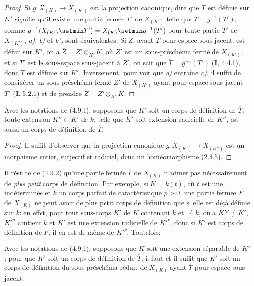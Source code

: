 \begin{proof}
Si $g:X_{(K)}\to X_{(K')}$ est la projection canonique, dire que
$\overline T$ est définie sur $K'$ signifie qu'il existe une partie fermée
$T'$ de $X_{(K')}$ telle que $\overline T=g^{-1}(T')$; comme
$g^{-1}(X_{(K')}\setmin T')=X_{(K)}\setmin g^{-1}(T')$ pour toute partie $T'$ de
$X_{(K')}$, \emph{a)}, \emph{b)} et \emph{b')} sont équivalentes. Si $\overline Z$, ayant
$\overline T$ pour espace sous-jacent, est défini sur $K'$, on a
$\overline Z=Z'\otimes_{K'}K$, où $Z'$ est un sous-préschéma fermé de
$X_{(K')}$, et si $T'$ est le sous-espace sous-jacent à $Z'$, on sait que
$\overline T=g^{-1}(T')$ (\textbf{I}, 4.4.1), donc $\overline T$ est définie sur
$K'$. Inversement, pour voir que \emph{a)} entraîne \emph{c)}, il suffit de considérer un
sous-préschéma fermé $Z'$ de $X_{(K')}$ ayant pour espace sous-jacent $T'$
(\textbf{I}, 5.2.1) et de prendre $\overline Z=Z'\otimes_{K'}K$.
\end{proof}

\begin{corollary}[4.9.2]
\label{IV.2.4.9.2-fr}
Avec les notations de \textup{(4.9.1)}, supposons que $K'$ soit un corps de définition
de $\overline T$; toute extension $K''\subset K'$ de $k$, telle que $K'$ soit
extension radicielle de $K''$, est aussi un corps de définition de
$\overline T$.
\end{corollary}

\begin{proof}
Il suffit d'observer que la projection canonique
$g:X_{(K')}\to X_{(K'')}$ est un morphisme entier, surjectif et radiciel,
donc un homéomorphisme (2.4.5).
\end{proof}

\begin{remark}[4.9.3]
\label{IV.2.4.9.3-fr}
Il résulte de (4.9.2) qu'une partie fermée $\overline T$ de $X_{(K)}$ n'admet
pas nécessairement de \emph{plus petit} corps de définition. Par exemple, si
$K=k(t)$, où $t$ est une indéterminée et $k$ un corps parfait de
caractéristique $p>0$, une partie fermée $\overline F$ de $X_{(K)}$ ne peut
avoir de plus petit corps de définition que si elle est déjà définie sur $k$:
en effet, pour tout sous-corps $K'$ de $K$ contenant $k$ et $\ne k$, on a
$K'^p\ne K'$, $K'^p$ contient $k$ et $K'$
est une extension radicielle de $K'^p$, donc si $K'$ est corps de définition
de $\overline F$, il en est de même de $K'^p$. Toutefois:
\end{remark}

\begin{proposition}[4.9.4]
\label{IV.2.4.9.4-fr}
Avec les notations de \textup{(4.9.1)}, supposons que $K$ soit une extension séparable
de $K'$; pour que $K'$ soit un corps de définition de $\overline T$, il faut
et il suffit que $K'$ soit un corps de définition du sous-préschéma réduit de
$X_{(K)}$ ayant $\overline T$ pour espace sous-jacent.
\end{proposition}

